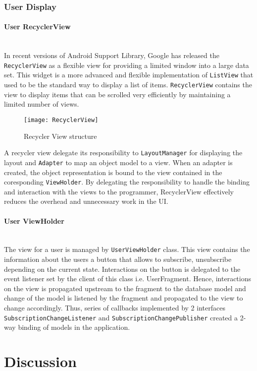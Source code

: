 \subsubsection{User Display}
\paragraph{User RecyclerView} \mbox{} \\
In recent versions of Android Support Library, Google has released the \texttt{RecyclerView} as a flexible view for
providing a limited window into a large data set. This widget is a more advanced and flexible implementation of
\texttt{ListView} that used to be the standard way to display a list of items. \texttt{RecyclerView} contains the view
to display items that can be scrolled very efficiently by maintaining a limited number of views\cite{RecyclerView}.
\begin{figure}[h]
    \centering
    \texttt{[image: RecyclerView]}
    \caption{Recycler View structure}
\end{figure}
A recycler view delegate its responsibility to \texttt{LayoutManager} for displaying the layout and \texttt{Adapter} to
map an object model to a view. When an adapter is created, the object representation is bound to the view contained in
the coresponding \texttt{ViewHolder}. By delegating the responsibility to handle the binding and interaction with the
views to the programmer, RecyclerView effectively reduces the overhead and unnecessary work in the UI.

\paragraph{User ViewHolder} \mbox{} \\
The view for a user is managed by \texttt{UserViewHolder} class. This view contains the information about the users a
button that allows to subscribe, unsubscribe depending on the current state. Interactions on the button is delegated to
the event listener set by the client of this class i.e. UserFragment. Hence, interactions on the view is propagated
upstream to the fragment to the database model and change of the model is listened by the fragment and propagated to the
view to change accordingly. Thus, series of callbacks implemented by 2 interfaces \texttt{SubscriptionChangeListener} and
\texttt{SubscriptionChangePublisher} created a 2-way binding of models in the application.

\section{Discussion}
